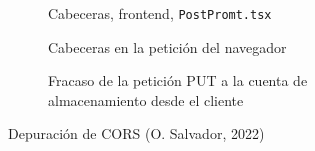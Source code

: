 \documentclass[11pt]{article}
\begin{document}
\begin{flushleft}
\begin{figure}[htb]
			\begin{subfigure}{.36\textwidth}
				\inputminted[fontsize=\tiny, firstline=80, lastline=91, linenos, frame=single, breaklines, breakafter=., breakaftersymbolpre={}]{javascript}{../../frontend/src/components/PostPrompt.tsx}
				\vspace{.8cm}
				\caption{Cabeceras, frontend, \texttt{PostPromt.tsx}}
			\end{subfigure}
			\begin{subfigure}{.55\textwidth}
				\centering
				\caption{Cabeceras en la petición del navegador}
			\end{subfigure}
			\linebreak

			\begin{subfigure}{\textwidth}
				\centering
				\caption{Fracaso de la petición PUT a la cuenta de almacenamiento desde el cliente}
			\end{subfigure}
			\caption{Depuración de CORS (O. Salvador, 2022)}
			\label{depuracion_CORS}
		\end{figure}















\end{flushleft}
\end{document}

